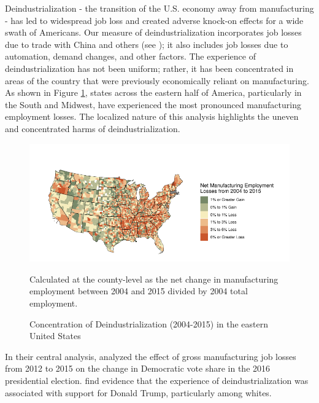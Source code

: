 \documentclass[]{AEA}
\begin{document}
Deindustrialization - the transition of the U.S. economy away from
manufacturing - has led to widespread job loss and created adverse
knock-on effects for a wide swath of Americans. Our measure of
deindustrialization incorporates job losses due to trade with China and
others (see \cite{Acemoglu16}); it also includes job losses due to
automation, demand changes, and other factors. The experience of
deindustrialization has not been uniform; rather, it has been
concentrated in areas of the country that were previously economically
reliant on manufacturing. As shown in Figure \ref{ManuMap}, states
across the eastern half of America, particularly in the South and
Midwest, have experienced the most pronounced manufacturing employment
losses. The localized nature of this analysis highlights the uneven and
concentrated harms of deindustrialization.

\FloatBarrier
\begin{figure} 
\caption{Concentration of Deindustrialization (2004-2015) in the eastern United States }
\label{ManuMap}

\begin{center}\includegraphics{Final-Draft_files/figure-latex/unnamed-chunk-2-1} \end{center}



\FloatBarrier
\begin{figurenotes}
Calculated at the county-level as the net change in manufacturing employment between 2004 and 2015 divided by 2004 total employment.
\end{figurenotes}
\end{figure}
\FloatBarrier

In their central analysis, \cite{Baccini21} analyzed the effect of gross
manufacturing job losses from 2012 to 2015 on the change in Democratic
vote share in the 2016 presidential election. \cite{Baccini21} find
evidence that the experience of deindustrialization was associated with
support for Donald Trump, particularly among whites.
\end{document}
